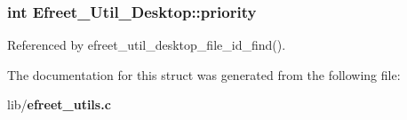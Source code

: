 \subsubsection{\setlength{\rightskip}{0pt plus 5cm}int {\bf Efreet\_\-Util\_\-Desktop::priority}}\label{structEfreet__Util__Desktop_0086937cac152f966601c95d48a44645}




Referenced by efreet\_\-util\_\-desktop\_\-file\_\-id\_\-find().

The documentation for this struct was generated from the following file:\begin{CompactItemize}
\item 
lib/{\bf efreet\_\-utils.c}\end{CompactItemize}
